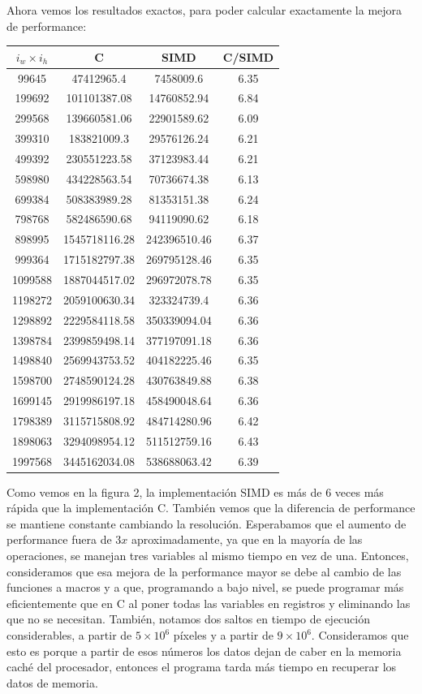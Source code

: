 Ahora vemos los resultados exactos, para poder calcular exactamente la mejora de performance:\\

\begin{center}
\begin{tabular}[H]{|c|c|c|c|}\hline
$i_w \times i_h$ & \textbf{C} & \textbf{SIMD} & \textbf{C/SIMD} \\\hline
99645 & 47412965.4 & 7458009.6 & 6.35\\
199692 & 101101387.08 & 14760852.94 & 6.84\\
299568 & 139660581.06 & 22901589.62 & 6.09\\
399310 & 183821009.3 & 29576126.24 & 6.21\\
499392 & 230551223.58 & 37123983.44 & 6.21\\
598980 & 434228563.54 & 70736674.38 & 6.13\\
699384 & 508383989.28 & 81353151.38 & 6.24\\
798768 & 582486590.68 & 94119090.62 & 6.18\\
898995 & 1545718116.28 & 242396510.46 & 6.37\\
999364 & 1715182797.38 & 269795128.46 & 6.35\\
1099588 & 1887044517.02 & 296972078.78 & 6.35\\
1198272 & 2059100630.34 & 323324739.4 & 6.36\\
1298892 & 2229584118.58 & 350339094.04 & 6.36\\
1398784 & 2399859498.14 & 377197091.18 & 6.36\\	
1498840 & 2569943753.52 & 404182225.46 & 6.35\\
1598700 & 2748590124.28 & 430763849.88 & 6.38\\
1699145 & 2919986197.18 & 458490048.64 & 6.36\\
1798389 & 3115715808.92 & 484714280.96 & 6.42\\
1898063 & 3294098954.12 & 511512759.16 & 6.43\\
1997568 & 3445162034.08 & 538688063.42 & 6.39\\\hline

\end{tabular}
\end{center}
\clearpage
Como vemos en la figura 2, la implementación SIMD es más de 6 veces más rápida que la implementación C. También vemos que la diferencia de performance se mantiene constante cambiando la resolución. Esperabamos que el aumento de performance fuera de $3x$ aproximadamente, ya que en la mayoría de las operaciones, se manejan tres variables al mismo tiempo en vez de una. Entonces, consideramos que esa mejora de la performance mayor se debe al cambio de las funciones a macros y a que, programando a bajo nivel, se puede programar más eficientemente que en C al poner todas las variables en registros y eliminando las que no se necesitan.
También, notamos dos saltos en tiempo de ejecución considerables, a partir de $5 \times 10^6$ píxeles y a partir de $9 \times 10^6$. Consideramos que esto es porque a partir de esos números los datos dejan de caber en la memoria caché del procesador, entonces el programa tarda más tiempo en recuperar los datos de memoria.